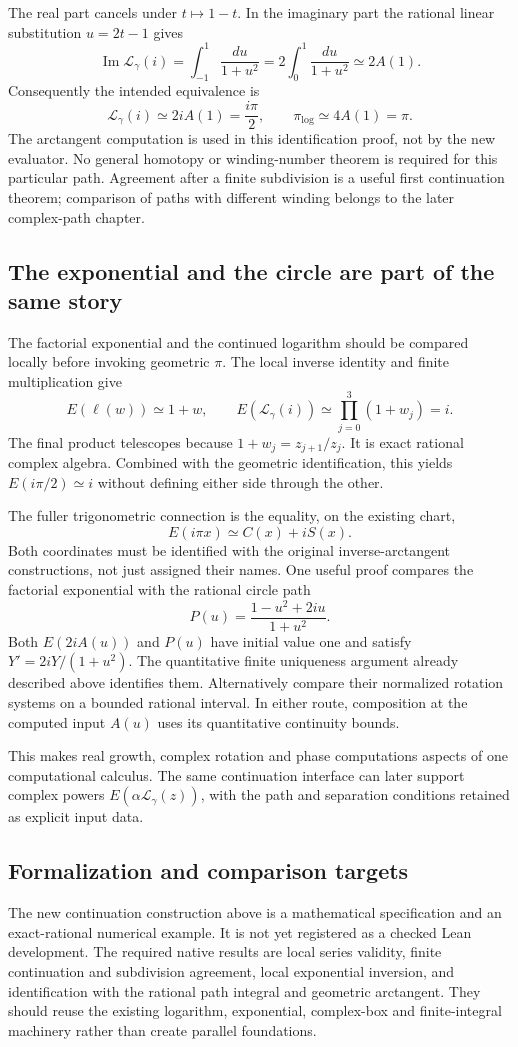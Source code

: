 The real part cancels under $t\mapsto1-t$. In the imaginary part the rational
linear substitution $u=2t-1$ gives
\[
 \operatorname{Im}\mathcal L_\gamma(i)
 =\int_{-1}^{1}\frac{du}{1+u^2}
 =2\int_0^1\frac{du}{1+u^2}
 \simeq2A(1).
\]
Consequently the intended equivalence is
\[
 \boxed{\mathcal L_\gamma(i)\simeq 2iA(1)=\frac{i\pi}{2},\qquad
        \pi_{\log}\simeq4A(1)=\pi.}
\]
The arctangent computation is used in this identification proof, not by the
new evaluator. No general homotopy or winding-number theorem is required
for this particular path. Agreement after a finite subdivision is a useful
first continuation theorem; comparison of paths with different winding belongs
to the later complex-path chapter.

\subsection{The exponential and the circle are part of the same story}
The factorial exponential and the continued logarithm should be compared
locally before invoking geometric $\pi$. The local inverse identity and
finite multiplication give
\[
 E(\ell(w))\simeq1+w,\qquad
 E(\mathcal L_\gamma(i))\simeq\prod_{j=0}^3(1+w_j)=i.
\]
The final product telescopes because $1+w_j=z_{j+1}/z_j$. It is exact rational
complex algebra. Combined with the geometric identification, this yields
$E(i\pi/2)\simeq i$ without defining either side through the other.

The fuller trigonometric connection is the equality, on the existing chart,
\[
 E(i\pi x)\simeq C(x)+iS(x).
\]
Both coordinates must be identified with the original inverse-arctangent
constructions, not just assigned their names. One useful proof compares the
factorial exponential with the rational circle path
\[
 P(u)=\frac{1-u^2+2iu}{1+u^2}.
\]
Both $E(2iA(u))$ and $P(u)$ have initial value one and satisfy
$Y'=2iY/(1+u^2)$. The quantitative finite uniqueness argument already described
above identifies them. Alternatively compare their normalized rotation
systems on a bounded rational interval. In either route, composition at the
computed input $A(u)$ uses its quantitative continuity bounds.

This makes real growth, complex rotation and phase computations aspects of
one computational calculus. The same continuation interface can later support
complex powers $E(\alpha\mathcal L_\gamma(z))$, with the path and separation
conditions retained as explicit input data.

\subsection{Formalization and comparison targets}
The new continuation construction above is a mathematical specification and
an exact-rational numerical example. It is not yet registered as a checked
Lean development. The required native results are local series validity,
finite continuation and subdivision agreement, local exponential inversion,
and identification with the rational path integral and geometric arctangent.
They should reuse the existing logarithm, exponential, complex-box and
finite-integral machinery rather than create parallel foundations.

